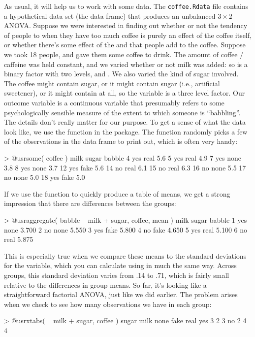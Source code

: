 As usual, it will help us to work with some data. The {\tt coffee.Rdata} file contains a hypothetical data set (the  data frame) that produces an unbalanced $3 \times 2$ ANOVA. Suppose we were interested in finding out whether or not the tendency of people to  when they have too much coffee is purely an effect of the coffee itself, or whether there's some effect of the  and  that people add to the coffee. Suppose we took 18 people, and gave them some coffee to drink. The amount of coffee / caffeine was held constant, and we varied whether or not milk was added: so  is a binary factor with two levels,  and . We also varied the kind of sugar involved. The coffee might contain  sugar, or it might contain  sugar (i.e., artificial sweetener), or it might contain  at all, so the  variable is a three level factor. Our outcome variable is a continuous variable that presumably refers to some psychologically sensible measure of the extent to which someone is ``babbling''. The details don't really matter for our purpose. To get a sense of what the data look like, we use the  function in the  package. The  function randomly picks a few of the observations in the data frame to print out, which is often very handy:
\begin{rblock1}
> @usr{some( coffee )}
   milk sugar babble
4   yes  real    5.6
5   yes  real    4.9
7   yes  none    3.8
8   yes  none    3.7
12  yes  fake    5.6
14   no  real    6.1
15   no  real    6.3
16   no  none    5.5
17   no  none    5.0
18  yes  fake    5.0
\end{rblock1}
If we use the  function to quickly produce a table of means, we get a strong impression that there are differences between the groups:
\begin{rblock1}
> @usr{aggregate( babble ~ milk + sugar, coffee, mean )}
  milk sugar babble
1  yes  none  3.700
2   no  none  5.550
3  yes  fake  5.800
4   no  fake  4.650
5  yes  real  5.100
6   no  real  5.875
\end{rblock1}
This is especially true when we compare these means to the standard deviations for the  variable, which you can calculate using  in much the same way. Across groups, this standard deviation varies from .14 to .71, which is fairly small relative to the differences in group means. So far, it's looking like a straightforward factorial ANOVA, just like we did earlier. The problem arises when we check to see how many observations we have in each group:
\begin{rblock1}
> @usr{xtabs( ~ milk + sugar, coffee )}
     sugar
milk  none fake real
  yes    3    2    3
  no     2    4    4
\end{rblock1}

